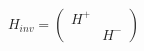 \begin{equation}
H_{inv} = \left( \begin{array}{cc} H^+ & \mbox{} \\
\mbox{} & H^- \end{array} \right)
\label{enop2}
\end{equation}

